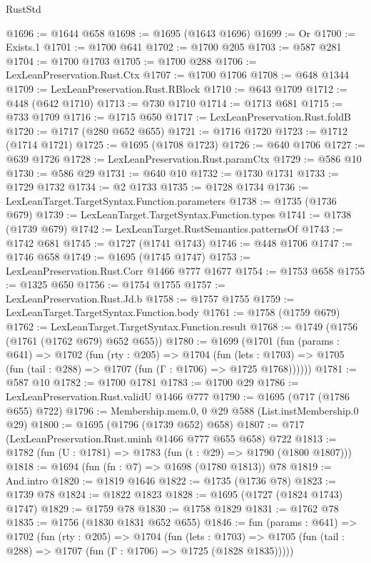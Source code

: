 \begin{lexlean}{RustStd}
\begin{coremodule}
@1696 := @1644 @658
@1698 := @1695 (@1643 @1696)
@1699 := Or
@1700 := Exists.{1}
@1701 := @1700 @641
@1702 := @1700 @205
@1703 := @587 @281
@1704 := @1700 @1703
@1705 := @1700 @288
@1706 := LexLeanPreservation.Rust.Ctx
@1707 := @1700 @1706
@1708 := @648 @1344
@1709 := LexLeanPreservation.Rust.RBlock
@1710 := @643 @1709
@1712 := @448 (@642 @1710)
@1713 := @730 @1710
@1714 := @1713 @681
@1715 := @733 @1709
@1716 := @1715 @650
@1717 := LexLeanPreservation.Rust.foldB
@1720 := @1717 (@280 @652 @655)
@1721 := @1716 @1720
@1723 := @1712 (@1714 @1721)
@1725 := @1695 (@1708 @1723)
@1726 := @640 @1706
@1727 := @639 @1726
@1728 := LexLeanPreservation.Rust.paramCtx
@1729 := @586 @10
@1730 := @586 @29
@1731 := @640 @10
@1732 := @1730 @1731
@1733 := @1729 @1732
@1734 := @2 @1733
@1735 := @1728 @1734
@1736 := LexLeanTarget.TargetSyntax.Function.parameters
@1738 := @1735 (@1736 @679)
@1739 := LexLeanTarget.TargetSyntax.Function.types
@1741 := @1738 (@1739 @679)
@1742 := LexLeanTarget.RustSemantics.patternsOf
@1743 := @1742 @681
@1745 := @1727 (@1741 @1743)
@1746 := @448 @1706
@1747 := @1746 @658
@1749 := @1695 (@1745 @1747)
@1753 := LexLeanPreservation.Rust.Corr @1466 @777 @1677
@1754 := @1753 @658
@1755 := @1325 @650
@1756 := @1754 @1755
@1757 := LexLeanPreservation.Rust.Jd.b
@1758 := @1757 @1755
@1759 := LexLeanTarget.TargetSyntax.Function.body
@1761 := @1758 (@1759 @679)
@1762 := LexLeanTarget.TargetSyntax.Function.result
@1768 := @1749 (@1756 (@1761 (@1762 @679) @652 @655))
@1780 := @1699
    (@1701
      (fun (params : @641) =>
      @1702
        (fun (rty : @205) =>
        @1704
          (fun (lets : @1703) =>
          @1705 (fun (tail : @288) => @1707 (fun (Γ : @1706) => @1725 @1768))))))
@1781 := @587 @10
@1782 := @1700 @1781
@1783 := @1700 @29
@1786 := LexLeanPreservation.Rust.validU @1466 @777
@1790 := @1695 (@717 (@1786 @655) @722)
@1796 := Membership.mem.{0, 0} @29 @588 (List.instMembership.{0} @29)
@1800 := @1695 (@1796 (@1739 @652) @658)
@1807 := @717 (LexLeanPreservation.Rust.uninh @1466 @777 @655 @658) @722
@1813 := @1782 (fun (U : @1781) => @1783 (fun (t : @29) => @1790 (@1800 @1807)))
@1818 := @1694 (fun (fn : @7) => @1698 (@1780 @1813)) @78
@1819 := And.intro
@1820 := @1819 @1646
@1822 := @1735 (@1736 @78)
@1823 := @1739 @78
@1824 := @1822 @1823
@1828 := @1695 (@1727 (@1824 @1743) @1747)
@1829 := @1759 @78
@1830 := @1758 @1829
@1831 := @1762 @78
@1835 := @1756 (@1830 @1831 @652 @655)
@1846 := fun (params : @641) =>
  @1702
    (fun (rty : @205) =>
    @1704
      (fun (lets : @1703) =>
      @1705 (fun (tail : @288) => @1707 (fun (Γ : @1706) => @1725 (@1828 @1835)))))

\end{coremodule}
\end{lexlean}
